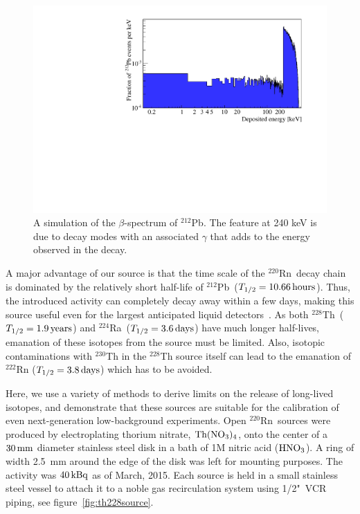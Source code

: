 \begin{figure}[htbp]
\centering
    \includegraphics[trim = 5 0 50 15, clip = true,width = 0.8\columnwidth]{figures/rnsource/pb212_spectrum}
    \caption{A simulation of the $\beta$-spectrum of $^{212}$Pb. The feature at 240 keV is due to decay modes with an associated $\gamma$ that adds to the energy observed in the decay.}\label{fig:pb212spectrum}
\end{figure}

A major advantage of our source is that the time scale of the $^{220}$Rn~decay chain is dominated by the relatively short half-life of $^{212}$Pb~($T_{1/2}=10.66\,\mathrm{hours}$). Thus, the introduced activity can completely decay away within a few days, making this source useful even for the largest anticipated liquid detectors~\cite{Baudis:2012,Akerib:2015cja,Franco:2015pha}. As both $^{228}$Th~($T_{1/2}=1.9\,\mathrm{years}$) and $^{224}$Ra~($T_{1/2}=3.6\,\mathrm{days}$) have much longer half-lives, emanation of these isotopes from the source must be limited. Also, isotopic contaminations with $^{230}$Th in the $^{228}$Th source itself can lead to the emanation of $^{222}$Rn ($T_{1/2}=3.8\,\mathrm{days}$) which has to be avoided.

Here, we use a variety of methods to derive limits on the release of long-lived isotopes, and demonstrate that these sources are suitable for the calibration of even next-generation low-background experiments. Open $^{220}$Rn~sources were produced by electroplating thorium nitrate, $\mathrm{Th}(\mathrm{NO}_3)_4$, onto the center of a $30\,\mathrm{mm}$ diameter stainless steel disk in a bath of 1M nitric acid ($\mathrm{HNO}_3$). A ring of width 2.5~mm around the edge of the disk was left for mounting purposes. The activity was $40\,\mathrm{kBq}$ as of March, 2015. Each source is held in a small stainless steel vessel to attach it to a noble gas recirculation system using 1/2"~VCR piping, see figure~\ref{fig:th228source}.

